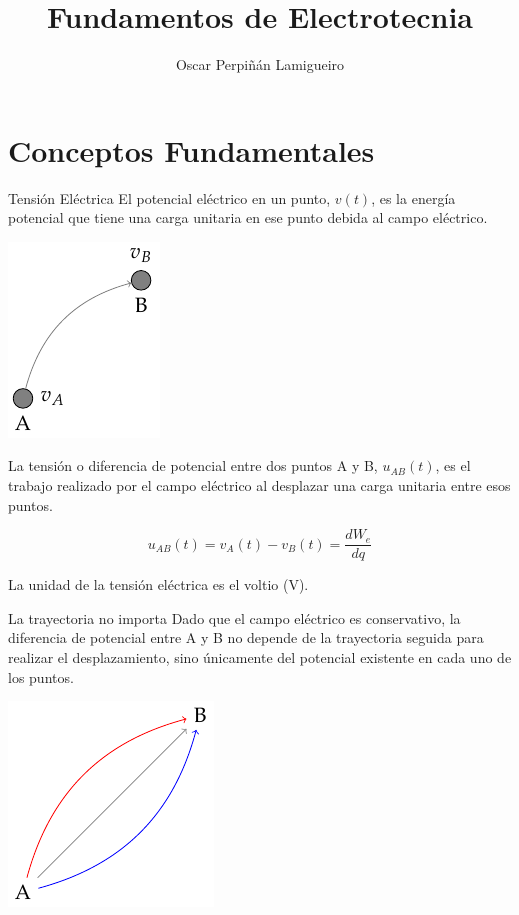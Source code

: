 \documentclass[xcolor={usenames,svgnames,dvipsnames}]{beamer}
\author{Oscar Perpiñán Lamigueiro}
\date{}
\title{Fundamentos de Electrotecnia}
\begin{document}
\maketitle

\section{Conceptos Fundamentales}
\label{sec:org78fb718}
\begin{frame}[label={sec:org1c31506}]{Tensión Eléctrica}
El \alert{potencial eléctrico en un punto}, \(v(t)\),  es la energía potencial que tiene una carga unitaria en ese punto debida al campo eléctrico. 

\begin{center}
\includegraphics[height=0.3\textheight]{figs/tension_puntos.pdf}
\end{center}

La \alert{tensión o diferencia de potencial entre dos puntos} A y B, \(u_{AB}(t)\), es el trabajo realizado por el campo eléctrico al desplazar una carga unitaria entre esos puntos. 

\begin{equation*}
  u_{AB}(t) = v_A(t) - v_B(t) = \frac{dW_{e}}{dq}
\end{equation*}

La \alert{unidad} de la tensión eléctrica es el \alert{voltio} (V).
\end{frame}

\begin{frame}[label={sec:org91f19e2}]{La trayectoria no importa}
Dado que el campo eléctrico es \alert{conservativo}, la diferencia de potencial entre A y B \alert{no depende de la trayectoria} seguida para realizar el desplazamiento, sino únicamente del potencial existente en cada uno de los puntos. 

\begin{center}
\includegraphics[height=0.6\textheight]{figs/diagrama_tension.pdf}
\end{center}
\end{frame}
\end{document}

